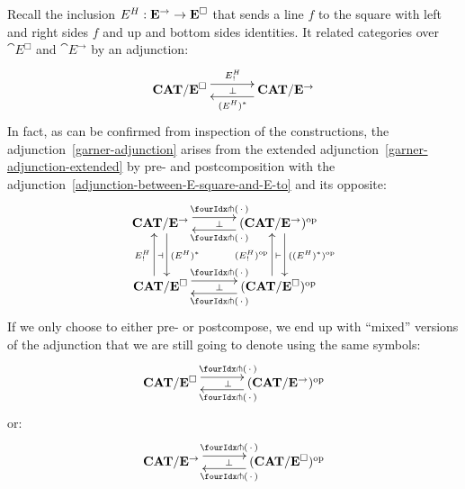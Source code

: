 \documentclass[reqno,10pt,a4paper,oneside]{amsart}
\begin{document}
\begin{remark}
\label{extended-adjunction-gives-normal-one}
Recall the inclusion $E{}^{H} : \mathbf{E}^{\to} \to \mathbf{E}^{\Box}$ that sends a line $f$ to the square with left and right sides $f$ and up and bottom sides identities.
It related categories over $\cat{E}^{\Box}$ and $\cat{E}^{\to}$ by an adjunction:
\begin{equation}
\label{adjunction-between-E-square-and-E-to}
\begin{gathered}
\xymatrix@C+1em{
  \CAT/\cat{E}^{\Box}
  \ar@<5pt>[r]^{E\sqhori_!}
  \ar@{}[r]|{\bot}
&
  \CAT/\cat{E}^{\to}
  \ar@<5pt>[l]^{(E\sqhori)^*}
}
\end{gathered}
\end{equation}
In fact, as can be confirmed from inspection of the constructions, the adjunction~\eqref{garner-adjunction} arises from the extended adjunction~\eqref{garner-adjunction-extended} by pre- and postcomposition with the adjunction~\eqref{adjunction-between-E-square-and-E-to} and its opposite:
\begin{equation*}
\begin{gathered}
\xymatrix@R+1em@C+1em{
  \CAT/\cat{E}^{\to}
  \ar@<5pt>[r]^{\liftl{\brarghole}}
  \ar@{}[r]|{\bot}
  \ar@<5pt>[d]^{(E\sqhori)^*}
  \ar@{}[d]|{\dashv}
&
  (\CAT/\cat{E}^{\to})^{\op}
  \ar@<5pt>[l]^{\liftr{\brarghole}}
  \ar@<5pt>[d]^{((E\sqhori)^*)^{\op}}
  \ar@{}[d]|{\vdash}
\\
  \CAT/\cat{E}^{\Box}
  \ar@<5pt>[r]^{\liftl{\brarghole}}
  \ar@{}[r]|{\bot}
  \ar@<5pt>[u]^{E\sqhori_!}
&
  (\CAT/\cat{E}^{\Box})^{\op}
  \ar@<5pt>[l]^{\liftr{\brarghole}}
  \ar@<5pt>[u]^{(E\sqhori_!)^{\op}}
}
\end{gathered}
\end{equation*}
If we only choose to either pre- or postcompose, we end up with ``mixed'' versions of the adjunction that we are still going to denote using the same symbols:
\begin{equation}
\label{garner-adjunction-extended-mixed}
\begin{gathered}
\xymatrix@C+1em{
  \CAT/\cat{E}^{\Box}
  \ar@<5pt>[r]^{\liftl{\brarghole}}
  \ar@{}[r]|{\bot}
&
  (\CAT/\cat{E}^{\to})^{\op}
  \ar@<5pt>[l]^{\liftr{\brarghole}}
}
\end{gathered}
\end{equation}
or:
\begin{equation}
\label{garner-adjunction-extended-mixed'}
\begin{gathered}
\xymatrix@C+1em{
  \CAT/\cat{E}^{\to}
  \ar@<5pt>[r]^{\liftl{\brarghole}}
  \ar@{}[r]|{\bot}
&
  (\CAT/\cat{E}^{\Box})^{\op}
  \ar@<5pt>[l]^{\liftr{\brarghole}}
}
\end{gathered}
\end{equation}
\end{remark}
\end{document}
